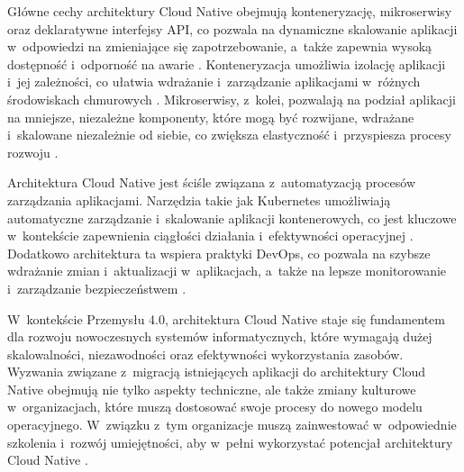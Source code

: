 Główne cechy architektury Cloud Native obejmują konteneryzację, mikroserwisy oraz deklaratywne interfejsy API, co pozwala na dynamiczne skalowanie aplikacji w~odpowiedzi na zmieniające się zapotrzebowanie, a~także zapewnia wysoką dostępność i~odporność na awarie \cite{Oyekunle2024CloudNativeReview}. Konteneryzacja umożliwia izolację aplikacji i~jej zależności, co ułatwia wdrażanie i~zarządzanie aplikacjami w~różnych środowiskach chmurowych \cite{Gannon2017CloudNativeApps}. Mikroserwisy, z~kolei, pozwalają na podział aplikacji na mniejsze, niezależne komponenty, które mogą być rozwijane, wdrażane i~skalowane niezależnie od siebie, co zwiększa elastyczność i~przyspiesza procesy rozwoju \cite{Balalaie2016MigratingCloudNative}.

Architektura Cloud Native jest ściśle związana z~automatyzacją procesów zarządzania aplikacjami. Narzędzia takie jak Kubernetes umożliwiają automatyczne zarządzanie i~skalowanie aplikacji kontenerowych, co jest kluczowe w~kontekście zapewnienia ciągłości działania i~efektywności operacyjnej \cite{Oyekunle2024CloudNativeReview}. Dodatkowo architektura ta wspiera praktyki DevOps, co pozwala na szybsze wdrażanie zmian i~aktualizacji w~aplikacjach, a~także na lepsze monitorowanie i~zarządzanie bezpieczeństwem \cite{Sojan2021DevSecOpsMonitoring}.

W~kontekście Przemysłu 4.0, architektura Cloud Native staje się fundamentem dla rozwoju nowoczesnych systemów informatycznych, które wymagają dużej skalowalności, niezawodności oraz efektywności wykorzystania zasobów. Wyzwania związane z~migracją istniejących aplikacji do architektury Cloud Native obejmują nie tylko aspekty techniczne, ale także zmiany kulturowe w~organizacjach, które muszą dostosować swoje procesy do nowego modelu operacyjnego. W~związku z~tym organizacje muszą zainwestować w~odpowiednie szkolenia i~rozwój umiejętności, aby w~pełni wykorzystać potencjał architektury Cloud Native \cite{Zhang2022CloudNativeMigration}.

